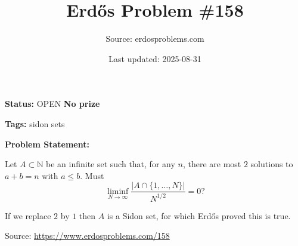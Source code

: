 \documentclass{article}
\title{Erd\H{o}s Problem \#158}
\date{Last updated: 2025-08-31}
\author{Source: erdosproblems.com}
\begin{document}
\maketitle

\noindent\textbf{Status:} OPEN \quad \textbf{No prize}

\noindent\textbf{Tags:} sidon sets

\medskip

\noindent\textbf{Problem Statement:}

Let $A\subset \mathbb{N}$ be an infinite set such that, for any $n$, there are most $2$ solutions to $a+b=n$ with $a\leq b$. Must\[\liminf_{N\to\infty}\frac{\lvert A\cap \{1,\ldots,N\}\rvert}{N^{1/2}}=0?\]




If we replace $2$ by $1$ then $A$ is a Sidon set, for which Erd\H{o}s proved this is true.


\bigskip
\noindent\small{Source: \url{https://www.erdosproblems.com/158}}
\end{document}
